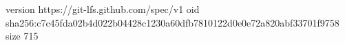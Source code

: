 version https://git-lfs.github.com/spec/v1
oid sha256:c7c45fda02b4d022b04428c1230a60dfb7810122d0e0e72a820abf33701f9758
size 715
